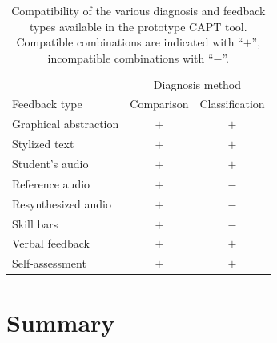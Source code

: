 	\begin{table}
		\centering
		\caption[Compatibility of diagnosis and feedback types]{Compatibility of the various diagnosis and feedback types available in the prototype CAPT tool. Compatible combinations are indicated with ``$+$'', incompatible combinations with ``$-$''.}
		\begin{tabular}{lcc}
		\toprule
		& \multicolumn{2}{c}{Diagnosis method} \\
		\cmidrule(lr){2-3}
		Feedback type & Comparison & Classification \\
		\midrule
		Graphical abstraction  & $+$ & $+$ \\
		Stylized text & $+$ & $+$ \\
		Student's audio & $+$ & $+$ \\
		Reference audio & $+$ & $-$ \\
		Resynthesized audio & $+$ & $-$ \\
		Skill bars & $+$ & $-$ \\
		Verbal feedback & $+$ & $+$ \\
		Self-assessment & $+$ & $+$ \\
		\bottomrule
		\end{tabular}
		\label{tab:fb:compatibility}
	\end{table}


\section{Summary}
\label{sec:fb:summary}
\TODO{}